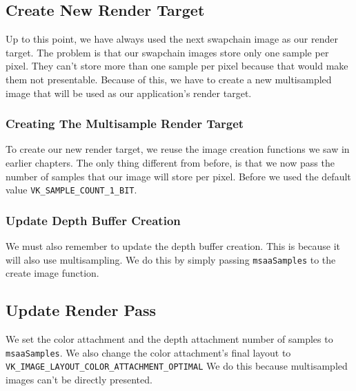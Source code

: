 \subsection{Create New Render Target}

Up to this point, we have always used the next swapchain image as our
render target.
The problem is that our swapchain images store only one sample per pixel.
They can't store more than one sample per pixel because that would make
them not presentable.
Because of this, we have to create a new multisampled image that will be used
as our application's render target.

\subsubsection{Creating The Multisample Render Target}

To create our new render target, we reuse the image creation functions
we saw in earlier chapters.
The only thing different from before, is that we now pass the
number of samples that our image will store per pixel.
Before we used the default value \texttt{VK\_SAMPLE\_COUNT\_1\_BIT}.

\begin{minipage}{\linewidth}{\noindent}
    
\end{minipage}

\subsubsection{Update Depth Buffer Creation}

We must also remember to update the depth buffer creation.
This is because it will also use multisampling.
We do this by simply passing \texttt{msaaSamples} to the create image
function.

\subsection{Update Render Pass}

We set the color attachment and the depth attachment number of
samples to \texttt{msaaSamples}.
We also change the color attachment's final layout to
\texttt{VK\_IMAGE\_LAYOUT\_COLOR\_ATTACHMENT\_OPTIMAL}
We do this because multisampled images can't be directly presented.

